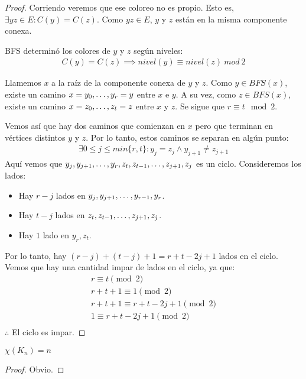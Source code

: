 \begin{proof}
Corriendo  veremos que ese coloreo no es propio. Esto es, $\exists yz \in E : C(y) = C(z)$. Como $yz \in E$, $y$ y $z$ están en la misma componente conexa.

BFS determinó los colores de $y$ y $z$ según niveles:
\begin{align}
    C(y) = C(z) \implies nivel(y) \equiv nivel(z)\ mod\ 2
\end{align}

Llamemos $x$ a la raíz de la componente conexa de $y$ y $z$. Como $y \in BFS(x)$, existe un camino $x = y_0, \mathellipsis, y_r = y$ entre $x$ e $y$. A su vez, como $z \in BFS(x)$, existe un camino $x = z_0, \mathellipsis, z_t = z$ entre $x$ y $z$. Se sigue que $r \equiv t \mod{2}$.

Vemos así que hay dos caminos que comienzan en $x$ pero que terminan en vértices distintos $y$ y $z$. Por lo tanto, estos caminos se separan en algún punto:
\begin{align}
    \exists 0 \le j \le min\{r,t\} \colon y_j = z_j \wedge y_{j+1} \neq z_{j+1}
\end{align}
Aquí vemos que $y_j, y_{j+1}, \mathellipsis, y_r, z_t, z_{t-1}, \mathellipsis, z_{j+1}, z_{j}$ es un ciclo.
Consideremos los lados:

\begin{itemize}
    \item Hay $r-j$ lados en $y_j, y_{j+1}, \mathellipsis, y_{r-1}, y_r$.
    \item Hay $t-j$ lados en $z_t, z_{t-1}, \mathellipsis, z_{j+1}, z_j$.
    \item Hay $1$ lado en $y_r,z_t$.
\end{itemize}

Por lo tanto, hay $(r-j)+(t-j)+1 = r+t-2j+1$ lados en el ciclo. Vemos que hay una cantidad impar de lados en el ciclo, ya que:
\begin{align}
    r \equiv t \pmod{2}\\
    r + t + 1 \equiv 1 \pmod{2}\\
    r + t + 1 \equiv r + t - 2j + 1 \pmod 2\\
    1 \equiv r + t - 2j + 1 \pmod 2\\
\end{align}
$\therefore$ El ciclo es impar.
\end{proof}

\begin{proposition}\label{chi_es_completo}
$\chi(K_{n}) = n$
\end{proposition}
\begin{proof}
Obvio.
\end{proof}

